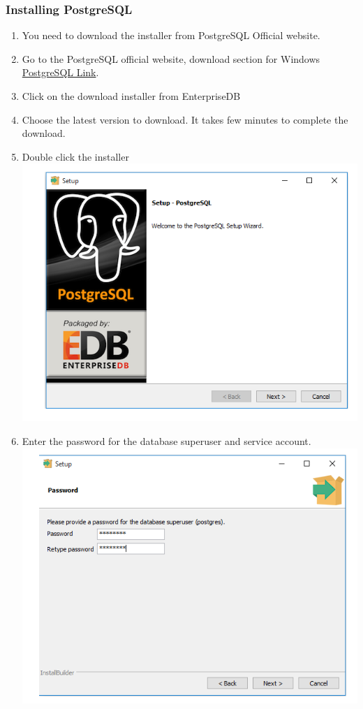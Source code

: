 \documentclass[a4paper,12pt]{article}
\begin{document}
\subsubsection{Installing PostgreSQL}
\begin{enumerate}
\item You need to download the installer from PostgreSQL Official website.
\item Go to the PostgreSQL official website, download section for Windows\\
\href{http://www.postgresql.org/download/windows/}{PostgreSQL Link}.
\item Click on the download installer from EnterpriseDB
\item Choose the latest version to download. It takes few minutes to complete the download.
\item Double click the installer\\
\includegraphics[width=0.9\linewidth, center]{./Installation/postGresql1.PNG}\\[0.4cm]
\item Enter the password for the database superuser and service account. \\ 
\includegraphics[width=0.9\linewidth, center]{./Installation/postGresql2.PNG}\\[0.4cm]

\end{enumerate}
\end{document}
